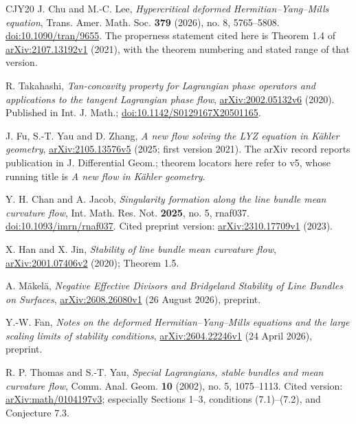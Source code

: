\documentclass[12pt,reqno]{amsart}
\numberwithin{equation}{section}
\theoremstyle{plain}
\theoremstyle{definition}
\begin{document}
\begin{thebibliography}{CJY20}
 J. Chu and M.-C. Lee, \emph{Hypercritical deformed Hermitian--Yang--Mills equation}, Trans. Amer. Math. Soc. \textbf{379} (2026), no. 8, 5765--5808. \href{https://doi.org/10.1090/tran/9655}{doi:10.1090/tran/9655}. The properness statement cited here is Theorem 1.4 of \href{https://arxiv.org/abs/2107.13192v1}{arXiv:2107.13192v1} (2021), with the theorem numbering and stated range of that version.

 R. Takahashi, \emph{Tan-concavity property for Lagrangian phase operators and applications to the tangent Lagrangian phase flow}, \href{https://arxiv.org/abs/2002.05132v6}{arXiv:2002.05132v6} (2020). Published in Int. J. Math.; \href{https://doi.org/10.1142/S0129167X20501165}{doi:10.1142/S0129167X20501165}.

 J. Fu, S.-T. Yau and D. Zhang, \emph{A new flow solving the LYZ equation in K\"ahler geometry}, \href{https://arxiv.org/abs/2105.13576v5}{arXiv:2105.13576v5} (2025; first version 2021). The arXiv record reports publication in J. Differential Geom.; theorem locators here refer to v5, whose running title is \emph{A new flow in K\"ahler geometry}.

 Y. H. Chan and A. Jacob, \emph{Singularity formation along the line bundle mean curvature flow}, Int. Math. Res. Not. \textbf{2025}, no. 5, rnaf037. \href{https://doi.org/10.1093/imrn/rnaf037}{doi:10.1093/imrn/rnaf037}. Cited preprint version: \href{https://arxiv.org/abs/2310.17709v1}{arXiv:2310.17709v1} (2023).

 X. Han and X. Jin, \emph{Stability of line bundle mean curvature flow}, \href{https://arxiv.org/abs/2001.07406v2}{arXiv:2001.07406v2} (2020); Theorem 1.5.

 A. M\"akel\"a, \emph{Negative Effective Divisors and Bridgeland Stability of Line Bundles on Surfaces}, \href{https://arxiv.org/abs/2608.26080v1}{arXiv:2608.26080v1} (26 August 2026), preprint.

 Y.-W. Fan, \emph{Notes on the deformed Hermitian--Yang--Mills equations and the large scaling limits of stability conditions}, \href{https://arxiv.org/abs/2604.22246v1}{arXiv:2604.22246v1} (24 April 2026), preprint.


 R. P. Thomas and S.-T. Yau,
\emph{Special Lagrangians, stable bundles and mean curvature flow},
Comm. Anal. Geom. \textbf{10} (2002), no. 5, 1075--1113.
Cited version: \href{https://arxiv.org/abs/math/0104197v3}{arXiv:math/0104197v3};
especially Sections 1--3, conditions (7.1)--(7.2), and Conjecture 7.3.


\end{thebibliography}
\end{document}
